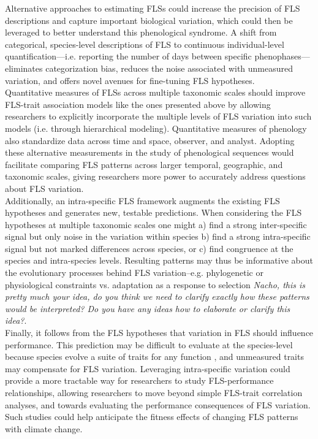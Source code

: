 \documentclass{article}
\begin{document}
\noindent Alternative approaches to estimating FLSs could increase the precision of FLS descriptions and capture important biological variation, which could then be leveraged to better understand this phenological syndrome. A shift from categorical, species-level descriptions of FLS to continuous individual-level quantification---i.e. reporting the number of days between specific phenophases---eliminates categorization bias, reduces the noise associated with unmeasured variation, and offers novel avenues for fine-tuning FLS hypotheses.\\ 

\noindent  Quantitative measures of FLSs across multiple taxonomic scales should improve FLS-trait association models like the ones presented above by allowing researchers to explicitly incorporate the multiple levels of FLS variation into such models (i.e. through hierarchical modeling). Quantitative measures of phenology \citep[e.g. the BBCH scale,][]{Finn2007} also standardize data across time and space, observer, and analyst. Adopting these alternative measurements in the study of phenological sequences would facilitate comparing FLS patterns across larger temporal, geographic, and taxonomic scales, giving researchers more power to accurately address questions about FLS variation.\\

\noindent Additionally, an intra-specific FLS framework augments the existing FLS hypotheses and generates new, testable predictions. When considering the FLS hypotheses at multiple taxonomic scales one might a) find a strong inter-specific signal but only noise in the variation within species b) find a strong intra-specific signal but not marked differences across species, or c) find congruence at the species and intra-species levels. Resulting patterns may thus be informative about the evolutionary processes behind FLS variation--e.g. phylogenetic or physiological constraints  vs. adaptation as a response to selection \emph{Nacho, this is pretty much your idea, do you think we need to clarify exactly how these patterns would be interpreted? Do you have any ideas how to elaborate or clarify this idea?}.\\

\noindent Finally, it follows from the FLS hypotheses that variation in FLS should influence performance. This prediction may be difficult to evaluate at the species-level because species evolve a suite of traits for any function \citep{Davies2019}, and unmeasured traits may compensate for FLS variation. Leveraging intra-specific variation could provide a more tractable way for researchers to study FLS-performance relationships, allowing researchers to move beyond simple FLS-trait correlation analyses, and towards evaluating the performance consequences of FLS variation. Such studies could help anticipate the fitness effects of changing FLS patterns with climate change.\\
\end{document}
